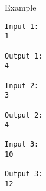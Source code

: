 Example
\begin{verbatim}
Input 1:
1

Output 1:
4

Input 2:
3

Output 2:
4

Input 3:
10

Output 3:
12
\end{verbatim}